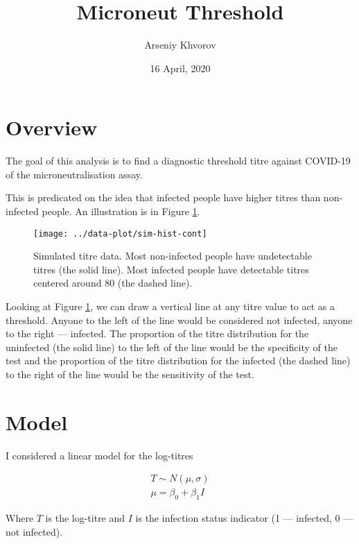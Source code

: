 \documentclass[]{article}
\title{Microneut Threshold}
\author{Arseniy Khvorov}
\date{16 April, 2020}
\begin{document}
\maketitle

\section{Overview}\label{overview}

The goal of this analysis is to find a diagnostic threshold titre
against COVID-19 of the microneutralisation assay.

This is predicated on the idea that infected people have higher titres
than non-infected people. An illustration is in Figure
\ref{fig:sim-hist-cont}.





\begin{figure}

{\centering \texttt{[image: ../data-plot/sim-hist-cont]} 

}

\caption{Simulated titre data. Most non-infected people have
undetectable titres (the solid line). Most infected people have
detectable titres centered around 80 (the dashed line).}\label{fig:sim-hist-cont}
\end{figure}

Looking at Figure \ref{fig:sim-hist-cont}, we can draw a vertical line
at any titre value to act as a threshold. Anyone to the left of the line
would be considered not infected, anyone to the right --- infected. The
proportion of the titre distribution for the uninfected (the solid line)
to the left of the line would be the specificity of the test and the
proportion of the titre distribution for the infected (the dashed line)
to the right of the line would be the sensitivity of the test.

\section{Model}\label{model}

I considered a linear model for the log-titres

\begin{gather*}
T \sim N(\mu, \sigma) \\
\mu = \beta_0 + \beta_1 I
\end{gather*}

Where \(T\) is the log-titre and \(I\) is the infection status indicator
(1 --- infected, 0 --- not infected).
\end{document}

